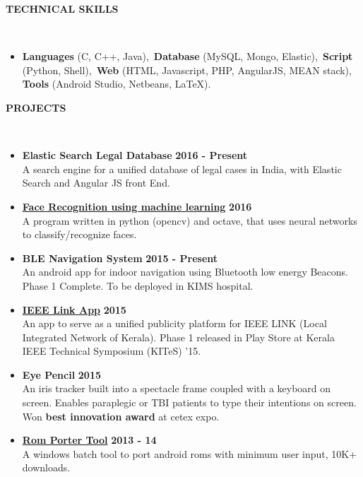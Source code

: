 \documentclass[a4paper,10pt]{article}
\newcommand{\lsep}{-0.5cm}
\newcommand{\resheading}[1]{{\small \colorbox{mygrey}{\begin{minipage}{0.975\textwidth}{\textbf{\uppercase{#1} \vphantom{p\^{E}}}}\end{minipage}}}}
\newcommand{\when}[1]{\hfill \textbf{#1}}
\newenvironment{noSepItemize}
{ \begin{itemize}
    \setlength{\itemsep}{1pt}
    \setlength{\parskip}{0pt}
    \setlength{\parsep}{0pt}     }
{ \end{itemize}                  }
\begin{document}
\resheading{\textbf{TECHNICAL SKILLS} }\\[\lsep]
\begin{noSepItemize}
\item \noindent \textbf{Languages} (C, C++, Java),\, \textbf{Database} (MySQL, Mongo, Elastic),\, \textbf{Script} (Python, Shell),\, \textbf{Web} (HTML, Javascript, PHP, AngularJS, MEAN stack),\, \textbf{Tools} (Android Studio, Netbeans, \LaTeX).
\end{noSepItemize}

\resheading{\textbf{PROJECTS} }\\[\lsep]
\begin{noSepItemize}
\item \textbf{Elastic Search Legal Database} \when{2016 - Present}\\
	A search engine for a unified database of legal cases in India, with Elastic Search and Angular JS front End.
\item \textbf{\href{https://github.com/moonblade/machineLearning/tree/master/faceRecognition}{Face Recognition using machine learning}} \when{2016}\\
	A program written in python (opencv) and octave, that uses neural networks to classify/recognize faces.
\item \textbf{BLE Navigation System} \when{2015 - Present}\\
	An android app for indoor navigation using Bluetooth low energy Beacons. Phase 1 Complete. To be deployed in KIMS hospital.
\item \textbf{\href{https://play.google.com/store/apps/details?id=com.juggleclouds.ieeelink}{IEEE Link App}} \when{2015}\\
	An app to serve as a unified publicity platform for IEEE LINK (Local Integrated Network of Kerala). Phase 1 released in Play Store at Kerala IEEE Technical Symposium (KITeS) '15.
\item \textbf{Eye Pencil} \when{2015}\\
	An iris tracker built into a spectacle frame coupled with a keyboard on screen. Enables 
paraplegic or TBI patients to type their intentions on screen. Won \textbf{best innovation award} at cetex expo.
\item \textbf{\href{http://forum.xda-developers.com/showthread.php?t=2276871}{Rom Porter Tool}} \when{2013 - 14}\\
	A windows batch tool to port android roms with minimum user input, 10K+ downloads.
\end{noSepItemize}
\end{document}
